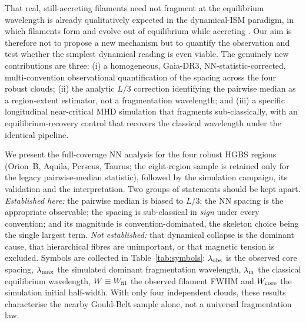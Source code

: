 \documentclass[usenatbib,twoside,twocolumn]{mnras}
\begin{document}
That real, still-accreting filaments need not fragment at the equilibrium wavelength is already qualitatively expected in the dynamical-ISM paradigm, in which filaments form and evolve out of equilibrium while accreting \citep{Andre2014,Clarke2016,Clarke2017,Clarke2020}. Our aim is therefore not to propose a new mechanism but to quantify the observation and test whether the simplest dynamical reading is even viable. The genuinely new contributions are three: (i) a homogeneous, Gaia-DR3, NN-statistic-corrected, multi-convention observational quantification of the spacing across the four robust clouds; (ii) the analytic $L/3$ correction identifying the pairwise median as a region-extent estimator, not a fragmentation wavelength; and (iii) a specific longitudinal near-critical MHD simulation that fragments sub-classically, with an equilibrium-recovery control that recovers the classical wavelength under the identical pipeline.

We present the full-coverage NN analysis for the four robust HGBS regions (Orion~B, Aquila, Perseus, Taurus; the eight-region sample is retained only for the legacy pairwise-median statistic), followed by the simulation campaign, its validation and the interpretation. Two groups of statements should be kept apart. \emph{Established here:} the pairwise median is biased to $L/3$; the NN spacing is the appropriate observable; the spacing is sub-classical in \emph{sign} under every convention; and its magnitude is convention-dominated, the skeleton choice being the single largest term. \emph{Not established:} that dynamical collapse is the dominant cause, that hierarchical fibres are unimportant, or that magnetic tension is excluded. Symbols are collected in Table~\ref{tab:symbols}: $\lambda_{\rm obs}$ is the observed core spacing, $\lambda_{\rm max}$ the simulated dominant fragmentation wavelength, $\lambda_{\rm m}$ the classical equilibrium wavelength, $W\equiv W_{\rm fil}$ the observed filament FWHM and $W_{\rm core}$ the simulation initial half-width. With only four independent clouds, these results characterise the nearby Gould-Belt sample alone, not a universal fragmentation law.
\end{document}
